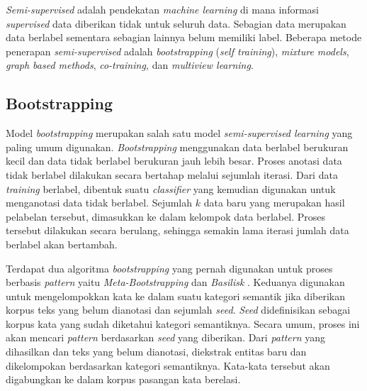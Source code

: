 \textit{Semi-supervised} adalah pendekatan \textit{machine learning} di mana informasi \textit{supervised} data diberikan tidak untuk seluruh data. Sebagian data merupakan data berlabel sementara sebagian lainnya belum memiliki label. Beberapa metode penerapan \textit{semi-supervised} adalah \textit{bootstrapping} (\textit{self training}), \textit{mixture models}, \textit{graph based methods}, \textit{co-training,} dan \textit{multiview learning}.

\subsection{Bootstrapping}
Model \textit{bootstrapping} merupakan salah satu model \textit{semi-supervised learning} yang paling umum digunakan. \textit{Bootstrapping} menggunakan data berlabel berukuran kecil dan data tidak berlabel berukuran jauh lebih besar. Proses anotasi data tidak berlabel dilakukan secara bertahap melalui sejumlah iterasi. Dari data \textit{training} berlabel, dibentuk suatu \textit{classifier} yang kemudian digunakan untuk menganotasi data tidak berlabel. Sejumlah $k$ data baru yang merupakan hasil pelabelan tersebut, dimasukkan ke dalam kelompok data berlabel. Proses tersebut dilakukan secara berulang, sehingga semakin lama iterasi jumlah data berlabel akan bertambah. 

Terdapat dua algoritma \textit{bootstrapping} yang pernah digunakan untuk proses berbasis \textit{pattern} yaitu \textit{Meta-Bootstrapping} dan \textit{Basilisk} \citep{riloff2003learning}. Keduanya digunakan untuk mengelompokkan kata ke dalam suatu kategori semantik jika diberikan korpus teks yang belum dianotasi dan sejumlah \textit{seed}. \textit{Seed} didefinisikan sebagai korpus kata yang sudah diketahui kategori semantiknya. Secara umum, proses ini akan mencari \textit{pattern} berdasarkan \textit{seed} yang diberikan. Dari \textit{pattern} yang dihasilkan dan teks yang belum dianotasi, diekstrak entitas baru dan dikelompokan berdasarkan kategori semantiknya. Kata-kata tersebut akan digabungkan ke dalam korpus pasangan kata berelasi.

